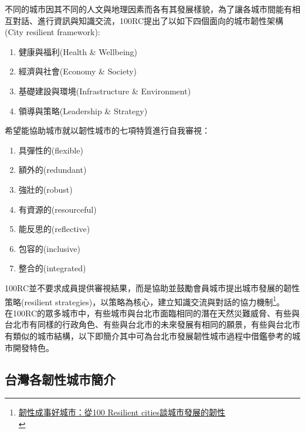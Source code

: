 \documentclass[a4paper,12pt]{article}
\begin{document}
不同的城市因其不同的人文與地理因素而各有其發展樣貌，為了讓各城市間能有相互對話、進行資訊與知識交流，100RC提出了以如下四個面向的城市韌性架構(City resilient framework):\\
\begin{enumerate}
\item 健康與福利(Health \& Wellbeing)\\
\item 經濟與社會(Economy \& Society)\\
\item 基礎建設與環境(Infrastructure \& Environment)\\
\item 領導與策略(Leadership \& Strategy)\\
\end{enumerate}
希望能協助城市就以韌性城市的七項特質進行自我審視：\\
\begin{enumerate}
\item 具彈性的(flexible)\\
\item 額外的(redundant)\\
\item 強壯的(robust)\\
\item 有資源的(resourceful)\\
\item 能反思的(reflective)\\
\item 包容的(inclusive)\\
\item 整合的(integrated)\\
\end{enumerate}
100RC並不要求成員提供審視結果，而是協助並鼓勵會員城市提出城市發展的韌性策略(resilient strategies)，以策略為核心，建立知識交流與對話的協力機制\footnote{\href{https://eyesonplace.net/2018/12/10/9521/}{韌性成事好城市：從100 Resilient cities談城市發展的韌性}\\\label{org7d9418b}}。\\

在100RC的眾多城市中，有些城市與台北市面臨相同的潛在天然災難威脅、有些與台北市有同樣的行政角色、有些與台北市的未來發展有相同的願景，有些與台北市有類似的城市結構，以下即簡介其中可為台北市發展韌性城市過程中借鑑參考的城市開發特色。\\
\newpage

\subsection{台灣各韌性城市簡介}
\label{sec:org6aa4ad4}
\end{document}
